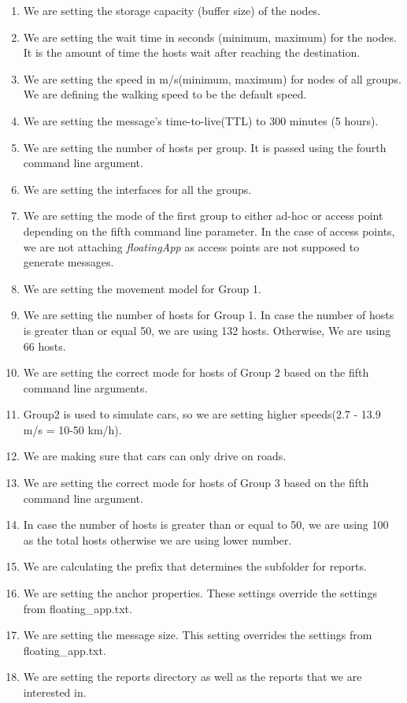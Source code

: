 \begin{enumerate}
  \item We are setting the storage capacity (buffer size) of the nodes.
  \item We are setting the wait time in seconds (minimum, maximum) for the nodes. It is the amount of time the hosts wait after reaching the destination.
  \item We are setting the speed in m/s(minimum, maximum) for nodes of all groups. We are defining the walking speed to be the default speed.
  \item We are setting the message's time-to-live(TTL) to 300 minutes (5 hours).
  \item We are setting the number of hosts per group. It is passed using the fourth command line argument.
  \item We are setting the interfaces for all the groups.
  \item We are setting the mode of the first group to either ad-hoc or access point depending on the fifth command line parameter. In the case of access points, we are not attaching \textit{floatingApp} as access points are not supposed to generate messages.
  \item We are setting the movement model for Group 1.
  \item We are setting the number of hosts for Group 1. In case the number of hosts is greater than or equal 50, we are using 132 hosts. Otherwise, We are using 66 hosts.
  \item We are setting the correct mode for hosts of Group 2 based on the fifth command line arguments.
  \item Group2 is used to simulate cars, so we are setting higher speeds(2.7 - 13.9 m/s = 10-50 km/h).
  \item We are making sure that cars can only drive on roads.
  \item We are setting the correct mode for hosts of Group 3 based on the fifth command line argument.
  \item In case the number of hosts is greater than or equal to 50, we are using 100 as the total hosts otherwise we are using lower number.
  \item We are calculating the prefix that determines the subfolder for reports.
  \item We are setting the anchor properties. These settings override the settings from floating\_app.txt.
  \item We are setting the message size. This setting overrides the settings from floating\_app.txt.
  \item We are setting the reports directory as well as the reports that we are interested in.

\end{enumerate}
